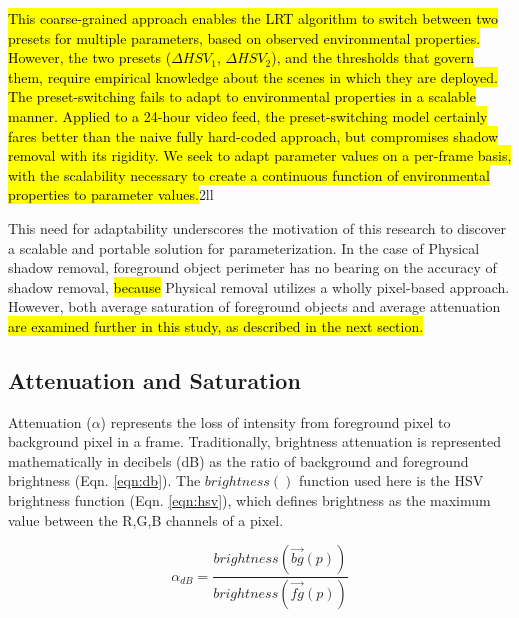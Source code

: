 \hl{This coarse-grained approach enables the LRT algorithm to switch between two presets for multiple parameters, based on observed environmental properties. However, the two presets ($\Delta HSV_{1}$, $\Delta HSV_{2}$), and the thresholds that govern them, require empirical knowledge about the scenes in which they are deployed. The preset-switching fails to adapt to environmental properties in a scalable manner. Applied to a 24-hour video feed, the preset-switching model certainly fares better than the naive fully hard-coded approach, but compromises shadow removal with its rigidity. We seek to adapt parameter values on a per-frame basis, with the scalability necessary to create a continuous function of environmental properties to parameter values.}2ll



This need for adaptability underscores the motivation of this research to discover a scalable and portable solution for parameterization. In the case of Physical shadow removal, foreground object perimeter has no bearing on the accuracy of shadow removal, \hl{because} Physical removal utilizes a wholly pixel-based approach. However, both average saturation of foreground objects and average attenuation \hl{are examined further in this study, as described in the next section.}

\subsection{Attenuation and Saturation}

 Attenuation ($\alpha$) represents the loss of intensity from foreground pixel to background pixel in a frame. Traditionally, brightness attenuation is represented mathematically in decibels (dB) as the ratio of background and foreground brightness (Eqn. \ref{eqn:db}). The $brightness()$ function used here is the HSV brightness function (Eqn. \ref{eqn:hsv}), which defines brightness as the maximum value between the R,G,B channels of a pixel. 

\begin{equation}
\alpha_{dB} = \dfrac{brightness(\vec{bg}(p))}{brightness(\vec{fg}(p))}
\label{eqn:db}
\end{equation}

